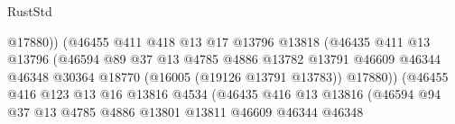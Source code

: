 \begin{lexlean}{RustStd}
\begin{coremodule}
                                              @17880))
                                          (@46455
                                            @411
                                            @418
                                            @13
                                            @17
                                            @13796
                                            @13818
                                            (@46435
                                              @411
                                              @13
                                              @13796
                                              (@46594
                                                @89
                                                @37
                                                @13
                                                @4785
                                                @4886
                                                @13782
                                                @13791
                                                @46609
                                                @46344
                                                @46348
                                                @30364
                                                @18770
                                                (@16005 (@19126 @13791 @13783))
                                                @17880))
                                            (@46455
                                              @416
                                              @123
                                              @13
                                              @16
                                              @13816
                                              @4534
                                              (@46435
                                                @416
                                                @13
                                                @13816
                                                (@46594
                                                  @94
                                                  @37
                                                  @13
                                                  @4785
                                                  @4886
                                                  @13801
                                                  @13811
                                                  @46609
                                                  @46344
                                                  @46348

\end{coremodule}
\end{lexlean}
